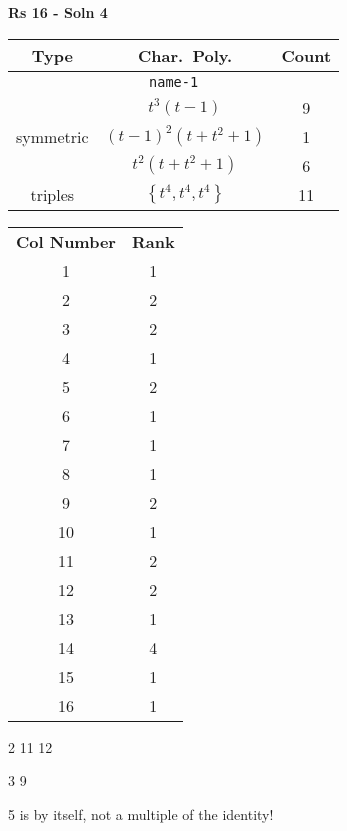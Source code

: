 \documentclass{article}
\begin{document}
    \textbf{Rs 16 - Soln 4}
    \begin{table}
    \begin{tabular}{|c|c|c|}
    \hline
    \textbf{Type} & \textbf{Char.~Poly.} & \textbf{Count} \\
    \hline \multicolumn{3}{|c|}{\texttt{name-1}} \\ \hline
    \multirow{3}{*}{symmetric}
    & $t^3(t - 1)$ & 9 \\
    & $(t - 1)^2(t + t^2 + 1)$ & 1 \\
    & $t^2(t + t^2 + 1)$ & 6 \\
    \hline
    \multirow{1}{*}{triples}
    & $\left\{t^4,t^4,t^4\right\}$ & 11 \\
    \hline
    \end{tabular}
    \end{table}
    \begin{table}
    \begin{tabular}{|c|c|}
    \hline
    \textbf{Col Number} & \textbf{Rank}\\
    1 & 1 \\ 
    2 & 2 \\ 
    3 & 2 \\ 
    4 & 1 \\ 
    5 & 2 \\ 
    6 & 1 \\ 
    7 & 1 \\ 
    8 & 1 \\ 
    9 & 2 \\ 
    10 & 1 \\ 
    11 & 2 \\ 
    12 & 2 \\ 
    13 & 1 \\ 
    14 & 4 \\ 
    15 & 1 \\ 
    16 & 1 \\ 
    \hline
    \end{tabular}
    \end{table}

    2 11 12

    3 9

    5 is by itself, not a multiple of the identity!

    \newpage
\end{document}
